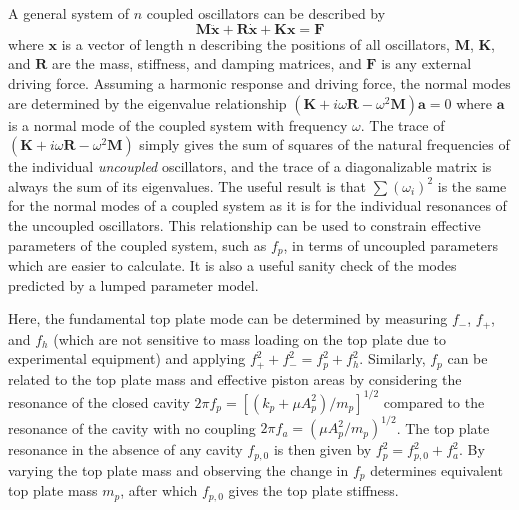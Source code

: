\documentclass[
reprint,amsmath,amssymb,showpacs,citeautoscript,prb,twocolumn,notitlepage,floatfix
]{revtex4-1}
\begin{document}
A general system of $n$ coupled oscillators can be described by
\begin{equation*}
\mathbf{M}\mathbf{\ddot{x}} + \mathbf{R}\mathbf{\dot{x}} + \mathbf{K} \mathbf{x} = \mathbf{F}
\end{equation*}
where $\mathbf{x}$ is a vector of length n describing the positions of all oscillators, $\mathbf{M}$, $\mathbf{K}$, and $\mathbf{R}$ are the mass, stiffness, and damping matrices, and $\mathbf{F}$ is any external driving force. Assuming a harmonic response and driving force, the normal modes are determined by the eigenvalue relationship $(\mathbf{K} + i \omega \mathbf{R} - \omega ^2 \mathbf{M})\mathbf{a} = 0$ where $\mathbf{a}$ is a normal mode of the coupled system with frequency $\omega$. The trace of $(\mathbf{K} + i \omega \mathbf{R} - \omega ^2 \mathbf{M})$ simply gives the sum of squares of the natural frequencies of the individual \emph{uncoupled} oscillators, and the trace of a diagonalizable matrix is always the sum of its eigenvalues. The useful result is that $\sum (\omega_i)^2$ is the same for the normal modes of a coupled system as it is for the individual resonances of the uncoupled oscillators. This relationship can be used to constrain effective parameters of the coupled system, such as $f_p$, in terms of uncoupled parameters which are easier to calculate. It is also a useful sanity check of the modes predicted by a lumped parameter model.

Here, the fundamental top plate mode can be determined by measuring $f_-$, $f_+$, and $f_h$ (which are not sensitive to mass loading on the top plate due to experimental equipment) and applying $f_+ ^2 + f_- ^2 = f_p ^2 + f_h ^2$. Similarly, $f_p$ can be related to the top plate mass and effective piston areas by considering the resonance of the closed cavity $2 \pi f_p = [(k_p + \mu A_p ^2)/m_p]^{1/2}$ compared to the resonance of the cavity with no coupling $2 \pi f_a = (\mu A_p ^2 / m_p) ^{1/2}$. The top plate resonance in the absence of any cavity $f_{p, 0}$ is then given by $f_p ^2 = f_{p, 0} ^2 + f_a ^2$. By varying the top plate mass and observing the change in $f_p$ determines equivalent top plate mass $m_p$, after which $f_{p, 0}$ gives the top plate stiffness.
\end{document}
